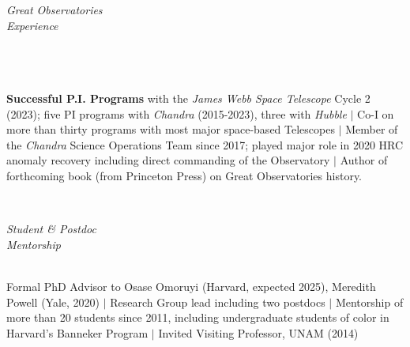\documentclass[11pt]{article}
\begin{document}
\vspace{3mm}

\hspace{2.5mm} \parbox{1.5in}{\textit{Great Observatories \\ Experience \\ \\ \\ \\ }} \parbox{5.15in}{\textbf{Successful P.I. Programs} with the \textit{James Webb Space Telescope} Cycle 2 (2023); five PI programs with \textit{Chandra} (2015-2023), three with \textit{Hubble} $|$ Co-I on more than thirty programs with most major space-based Telescopes $|$ Member of the \textit{Chandra} Science Operations Team since 2017; played major role in 2020 HRC anomaly recovery including direct commanding of the Observatory $|$ Author of forthcoming book (from Princeton Press) on Great Observatories history. } \\


\vspace{3mm}



\hspace{2.5mm} \parbox{1.5in}{\textit{Student \& Postdoc \\ Mentorship \\\\}} \parbox{5.15in} {Formal PhD Advisor to Osase Omoruyi (Harvard, expected 2025), Meredith Powell (Yale, 2020) $|$ Research Group lead including two postdocs $|$ Mentorship of more than 20 students since 2011, including undergraduate students of color in Harvard's Banneker Program $|$ Invited Visiting Professor, UNAM (2014)}\\\\
\end{document}
